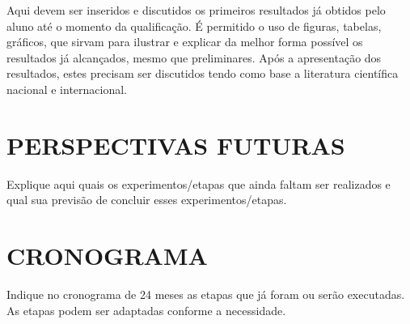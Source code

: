 \documentclass[oneside, 12pt,article, a4paper]{memoir}
\begin{document}
Aqui devem ser inseridos e discutidos os primeiros resultados já obtidos pelo aluno até o momento da qualificação. É permitido o uso de figuras, tabelas, gráficos, que sirvam para ilustrar e explicar da melhor forma possível os resultados já alcançados, mesmo que preliminares.
Após a apresentação dos resultados, estes precisam ser discutidos tendo como base a literatura científica nacional e internacional.

\chapter{PERSPECTIVAS FUTURAS}

Explique aqui quais os experimentos/etapas que ainda faltam ser realizados e qual sua previsão de concluir esses experimentos/etapas. 

\chapter{CRONOGRAMA}
Indique no cronograma de 24 meses as etapas que já foram ou serão executadas. As etapas podem ser adaptadas conforme a necessidade.
\end{document}
